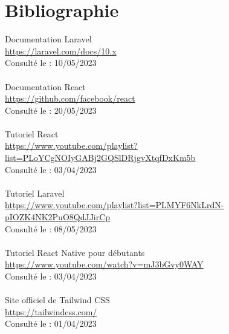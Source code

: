 \clearpage
\vspace{.5cm}
\chapter*{Bibliographie}

Documentation Laravel\\
\href{https://laravel.com/docs/10.x}{https://laravel.com/docs/10.x}\\
Consulté le : 10/05/2023 \\\\

Documentation React\\
\href{https://github.com/facebook/react}{https://github.com/facebook/react}\\
Consulté le : 20/05/2023 \\\\

Tutoriel React  \\
\href{https://www.youtube.com/playlist?list=PLoYCgNOIyGABj2GQSlDRjgvXtqfDxKm5b}{https://www.youtube.com/playlist?list=PLoYCgNOIyGABj2GQSlDRjgvXtqfDxKm5b}
\\
Consulté le : 03/04/2023 \\\\

Tutoriel Laravel  \\
\href{https://www.youtube.com/playlist?list=PLMYF6NkLrdN-pIOZK4NK2PuO8QdJJirCp}{https://www.youtube.com/playlist?list=PLMYF6NkLrdN-pIOZK4NK2PuO8QdJJirCp}
\\
Consulté le : 08/05/2023 \\\\

Tutoriel React Native pour débutants\\
\href{https://www.youtube.com/watch?v=mJ3bGvy0WAY}{https://www.youtube.com/watch?v=mJ3bGvy0WAY}\\
Consulté le : 03/04/2023 \\\\

Site officiel de Tailwind CSS \\
\href{https://tailwindcss.com/}{https://tailwindcss.com/} \\
Consulté le : 01/04/2023 \\\\











